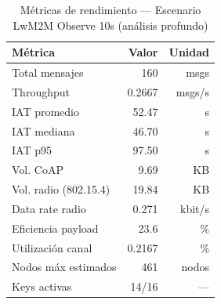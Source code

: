 
\begin{table}[htbp]
\centering
\caption{Métricas de rendimiento — Escenario LwM2M Observe 10s (análisis profundo)}
\label{tab:lwm2m-10s-deep}
\begin{tabular}{lrr}
\toprule
\textbf{Métrica} & \textbf{Valor} & \textbf{Unidad} \\
\midrule
Total mensajes & 160 & msgs \\
Throughput & 0.2667 & msgs/s \\
IAT promedio & 52.47 & s \\
IAT mediana & 46.70 & s \\
IAT p95 & 97.50 & s \\
Vol. CoAP & 9.69 & KB \\
Vol. radio (802.15.4) & 19.84 & KB \\
Data rate radio & 0.271 & kbit/s \\
Eficiencia payload & 23.6 & \% \\
Utilización canal & 0.2167 & \% \\
Nodos máx estimados & 461 & nodos \\
Keys activas & 14/16 & --- \\
\bottomrule
\end{tabular}
\end{table}
